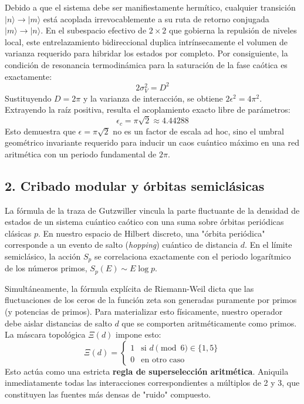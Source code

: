 \documentclass[aps,prl,preprint,superscriptaddress,floatfix]{revtex4-2}
\begin{document}
Debido a que el sistema debe ser manifiestamente hermítico, cualquier transición $|n\rangle \to |m\rangle$ está acoplada irrevocablemente a su ruta de retorno conjugada $|m\rangle \to |n\rangle$. En el subespacio efectivo de $2 \times 2$ que gobierna la repulsión de niveles local, este entrelazamiento bidireccional duplica intrínsecamente el volumen de varianza requerido para hibridar los estados por completo. Por consiguiente, la condición de resonancia termodinámica para la saturación de la fase caótica es exactamente:
\begin{equation}
2 \sigma_V^2 = D^2
\end{equation}
Sustituyendo $D = 2\pi$ y la varianza de interacción, se obtiene $2 \epsilon^2 = 4\pi^2$. Extrayendo la raíz positiva, resulta el acoplamiento exacto libre de parámetros:
\begin{equation}
\epsilon_c = \pi\sqrt{2} \approx 4.44288
\end{equation}
Esto demuestra que $\epsilon = \pi\sqrt{2}$ no es un factor de escala ad hoc, sino el umbral geométrico invariante requerido para inducir un caos cuántico máximo en una red aritmética con un periodo fundamental de $2\pi$.

\subsection{2. Cribado modular y órbitas semiclásicas}
La fórmula de la traza de Gutzwiller vincula la parte fluctuante de la densidad de estados de un sistema cuántico caótico con una suma sobre órbitas periódicas clásicas $p$. En nuestro espacio de Hilbert discreto, una "órbita periódica" corresponde a un evento de salto (\textit{hopping}) cuántico de distancia $d$. En el límite semiclásico, la acción $S_p$ se correlaciona exactamente con el periodo logarítmico de los números primos, $S_p(E) \sim E \log p$.

Simultáneamente, la fórmula explícita de Riemann-Weil dicta que las fluctuaciones de los ceros de la función zeta son generadas puramente por primos (y potencias de primos). Para materializar esto físicamente, nuestro operador debe aislar distancias de salto $d$ que se comporten aritméticamente como primos. La máscara topológica $\Xi(d)$ impone esto:
\begin{equation}
\Xi(d) = \begin{cases} 1 & \text{si } d \pmod 6 \in \{1, 5\} \\ 0 & \text{en otro caso} \end{cases}
\end{equation}
Esto actúa como una estricta \textbf{regla de superselección aritmética}. Aniquila inmediatamente todas las interacciones correspondientes a múltiplos de 2 y 3, que constituyen las fuentes más densas de "ruido" compuesto. 
\end{document}
